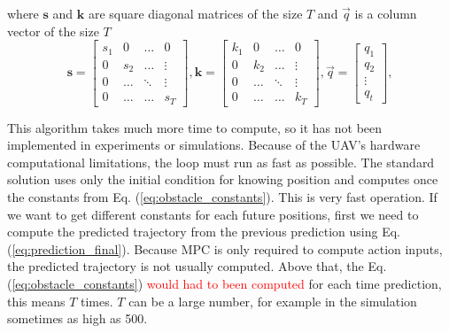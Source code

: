 \documentclass[a4paper,11pt,titlepage]{article}
\begin{document}
where $\textbf{s}$ and $\textbf{k}$ are square diagonal matrices of the size $T$ and $\vec{q}$ is a column vector of the size $T$
\begin{equation}
\label{eq:obstacle_constants_matrices}
\textbf{s} = \begin{bmatrix}
s_1 & 0 & \hdots & 0 \\
0 & s_2 & \hdots & \vdots \\
0 & \hdots & \ddots & \vdots \\
0 & \hdots & \hdots & s_T
\end{bmatrix},
\textbf{k} = \begin{bmatrix}
k_1 & 0 & \hdots & 0 \\
0 & k_2 & \hdots & \vdots \\
0 & \hdots & \ddots & \vdots \\
0 & \hdots & \hdots & k_T
\end{bmatrix},
\vec{q} = \begin{bmatrix}
q_1 \\
q_2 \\
\vdots \\
q_t
\end{bmatrix},
\end{equation}

This algorithm takes much more time to compute, so it has not been implemented in experiments or simulations. Because of the UAV's hardware computational limitations, the loop must run as fast as possible. The standard solution uses only the initial condition for knowing position and computes once the constants from Eq. (\ref{eq:obstacle_constants}). This is very fast operation. If we want to get different constants for each future positions, first we need to compute the predicted trajectory from the previous prediction using Eq. (\ref{eq:prediction_final}). Because MPC is only required to compute action inputs, the predicted trajectory is not usually computed. Above that, the Eq. (\ref{eq:obstacle_constants}) \textcolor{red}{would had to been computed} for each time prediction, this means $T$ times. $T$ can be a large number, for example in the simulation sometimes as high as 500.
\end{document}
